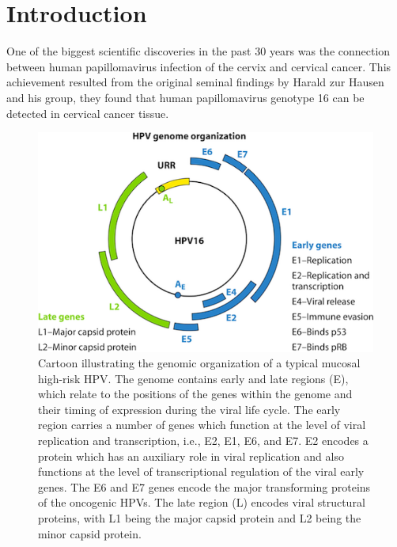 
\chapter{Introduction}\label{victor protocolo hpv redes.doc julio 2016}


One of the biggest scientific discoveries in the past 30 years was the connection between human papillomavirus infection of the cervix and cervical cancer. This achievement resulted from the original seminal findings by Harald zur Hausen and his group, they found that human papillomavirus genotype 16 can be detected in cervical cancer tissue. 
\begin{figure}[ht]
	\centering
	\includegraphics[scale=0.7]{IMG/genoma.png}
	\caption{Cartoon illustrating the genomic organization of a typical mucosal high-risk HPV. The genome contains early and late regions (E), which relate to the positions of the genes within the genome and their timing of expression during the viral life cycle. The early region carries a number of genes which function at the level of viral replication and transcription, i.e., E2, E1, E6, and E7. E2 encodes a protein which has an auxiliary role in viral replication and also functions at the level of transcriptional regulation of the viral early genes. The E6 and E7 genes encode the major transforming proteins of the oncogenic HPVs. The late region (L) encodes viral structural proteins, with L1 being the major capsid protein and L2 being the minor capsid protein.}
	\label{genoma}
\end{figure}


